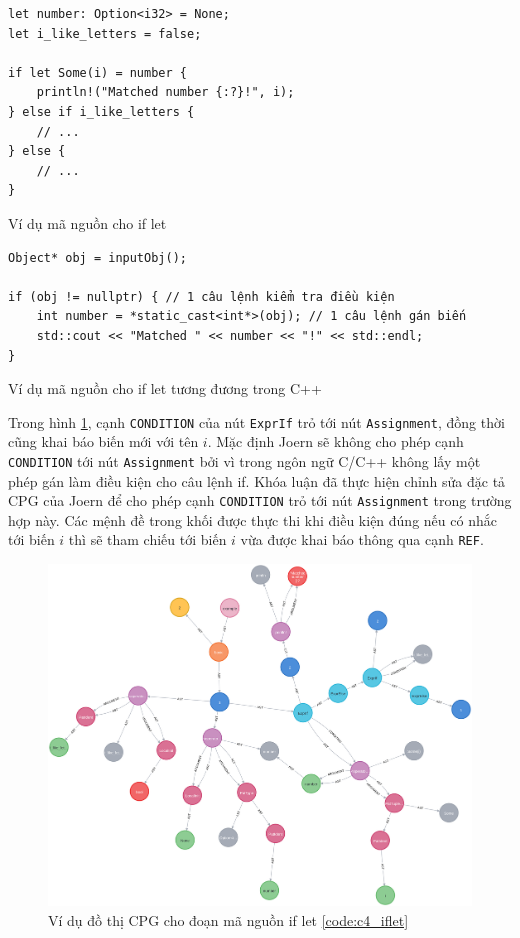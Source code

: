 \begin{listing}[H]
\begin{verbatim}
let number: Option<i32> = None;
let i_like_letters = false;

if let Some(i) = number {
    println!("Matched number {:?}!", i);
} else if i_like_letters {
    // ...
} else {
    // ...
}
\end{verbatim}
\caption{Ví dụ mã nguồn cho if let}
\label{code:c4_iflet}
\end{listing}

\begin{listing}[H]
\begin{verbatim}
Object* obj = inputObj();

if (obj != nullptr) { // 1 câu lệnh kiểm tra điều kiện
    int number = *static_cast<int*>(obj); // 1 câu lệnh gán biến
    std::cout << "Matched " << number << "!" << std::endl;
}
\end{verbatim}
\caption{Ví dụ mã nguồn cho if let tương đương trong C++}
\label{code:c4_iflet_cpp}
\end{listing}

Trong hình \ref{img:c4_cpg_iflet}, cạnh \texttt{CONDITION} của nút \texttt{ExprIf} trỏ tới nút \texttt{Assignment}, đồng thời cũng khai báo biến mới với tên $i$.
Mặc định Joern sẽ không cho phép cạnh \texttt{CONDITION} tới nút \texttt{Assignment} bởi vì trong ngôn ngữ C/C++ không lấy một phép gán làm điều kiện cho câu lệnh if.
Khóa luận đã thực hiện chỉnh sửa đặc tả CPG của Joern để cho phép cạnh \texttt{CONDITION} trỏ tới nút \texttt{Assignment} trong trường hợp này.
Các mệnh đề trong khối được thực thi khi điều kiện đúng nếu có nhắc tới biến $i$ thì sẽ tham chiếu tới biến $i$ vừa được khai báo thông qua cạnh \texttt{REF}.

\begin{figure}[H]
\includegraphics[width=1\columnwidth]{figures/c4/c4_iflet.png}
\centering
\caption{Ví dụ đồ thị CPG cho đoạn mã nguồn if let \ref{code:c4_iflet}}
\label{img:c4_cpg_iflet}
\end{figure}

